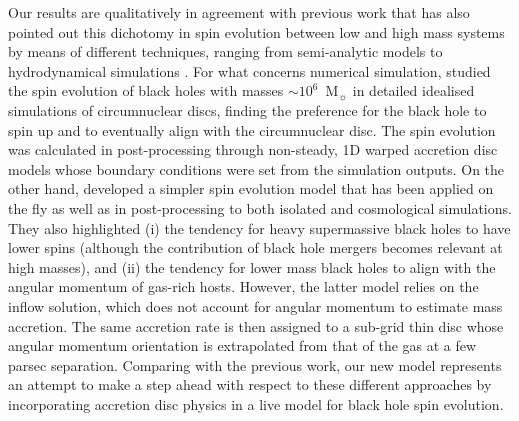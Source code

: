 \documentclass[a4paper,fleqn,usenatbib]{mnras}
\begin{document}
Our results are qualitatively in agreement with previous work that has also pointed out this dichotomy in spin evolution between low and high mass systems by means of different techniques, ranging from semi-analytic models \citep{sesana+14} to hydrodynamical simulations \citep{maio+13,dubois+14a, dubois+14b}.
For what concerns numerical simulation, \citet{maio+13} studied the spin evolution of black holes with masses $\sim 10^{6}$~M$_{\sun}$ in detailed idealised simulations of circumnuclear discs, finding the preference for the black hole to spin up and to eventually align with the circumnuclear disc.
The spin evolution was calculated in post-processing through non-steady, 1D warped accretion disc models whose boundary conditions were set from the simulation outputs.
On the other hand, \citet{dubois+14a, dubois+14b} developed a simpler spin evolution model that has been applied on the fly as well as in post-processing to both isolated and cosmological simulations.
They also highlighted (i) the tendency for heavy supermassive black holes to have lower spins (although the contribution of black hole mergers becomes relevant at high masses), and (ii) the tendency for lower mass black holes to align with the angular momentum of gas-rich hosts.
However, the latter model relies on the \citet{bondi+52} inflow solution, which does not account for angular momentum to estimate mass accretion.
The same accretion rate is then assigned to a sub-grid thin disc whose angular momentum orientation is extrapolated from that of the gas at a few parsec separation.
Comparing with the previous work, our new model represents an attempt to make a step ahead with respect to these different approaches by incorporating accretion disc physics in a live model for black hole spin evolution.
\end{document}
